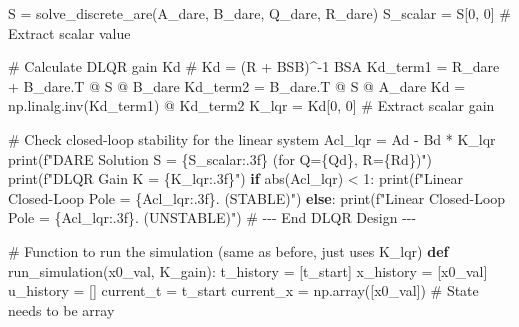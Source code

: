 \documentclass[
  letterpaper,
  DIV=11,
  numbers=noendperiod,
  oneside]{scrartcl}
\newenvironment{Shaded}{\begin{snugshade}}{\end{snugshade}}
\newcommand{\BuiltInTok}[1]{\textcolor[rgb]{0.00,0.23,0.31}{#1}}
\newcommand{\CommentTok}[1]{\textcolor[rgb]{0.37,0.37,0.37}{#1}}
\newcommand{\ControlFlowTok}[1]{\textcolor[rgb]{0.00,0.23,0.31}{\textbf{#1}}}
\newcommand{\DecValTok}[1]{\textcolor[rgb]{0.68,0.00,0.00}{#1}}
\newcommand{\KeywordTok}[1]{\textcolor[rgb]{0.00,0.23,0.31}{\textbf{#1}}}
\newcommand{\NormalTok}[1]{\textcolor[rgb]{0.00,0.23,0.31}{#1}}
\newcommand{\OperatorTok}[1]{\textcolor[rgb]{0.37,0.37,0.37}{#1}}
\newcommand{\SpecialCharTok}[1]{\textcolor[rgb]{0.37,0.37,0.37}{#1}}
\newcommand{\SpecialStringTok}[1]{\textcolor[rgb]{0.13,0.47,0.30}{#1}}
\begin{document}
\begin{Shaded}
\begin{Highlighting}[numbers=left,,]
\NormalTok{S }\OperatorTok{=}\NormalTok{ solve\_discrete\_are(A\_dare, B\_dare, Q\_dare, R\_dare)}
\NormalTok{S\_scalar }\OperatorTok{=}\NormalTok{ S[}\DecValTok{0}\NormalTok{, }\DecValTok{0}\NormalTok{] }\CommentTok{\# Extract scalar value}

\CommentTok{\# Calculate DLQR gain Kd}
\CommentTok{\# Kd = (R + B\textquotesingle{}SB)\^{}{-}1 B\textquotesingle{}SA}
\NormalTok{Kd\_term1 }\OperatorTok{=}\NormalTok{ R\_dare }\OperatorTok{+}\NormalTok{ B\_dare.T }\OperatorTok{@}\NormalTok{ S }\OperatorTok{@}\NormalTok{ B\_dare}
\NormalTok{Kd\_term2 }\OperatorTok{=}\NormalTok{ B\_dare.T }\OperatorTok{@}\NormalTok{ S }\OperatorTok{@}\NormalTok{ A\_dare}
\NormalTok{Kd }\OperatorTok{=}\NormalTok{ np.linalg.inv(Kd\_term1) }\OperatorTok{@}\NormalTok{ Kd\_term2}
\NormalTok{K\_lqr }\OperatorTok{=}\NormalTok{ Kd[}\DecValTok{0}\NormalTok{, }\DecValTok{0}\NormalTok{] }\CommentTok{\# Extract scalar gain}

\CommentTok{\# Check closed{-}loop stability for the linear system}
\NormalTok{Acl\_lqr }\OperatorTok{=}\NormalTok{ Ad }\OperatorTok{{-}}\NormalTok{ Bd }\OperatorTok{*}\NormalTok{ K\_lqr}
\BuiltInTok{print}\NormalTok{(}\SpecialStringTok{f"DARE Solution S = }\SpecialCharTok{\{}\NormalTok{S\_scalar}\SpecialCharTok{:.3f\}}\SpecialStringTok{ (for Q=}\SpecialCharTok{\{}\NormalTok{Qd}\SpecialCharTok{\}}\SpecialStringTok{, R=}\SpecialCharTok{\{}\NormalTok{Rd}\SpecialCharTok{\}}\SpecialStringTok{)"}\NormalTok{)}
\BuiltInTok{print}\NormalTok{(}\SpecialStringTok{f"DLQR Gain K = }\SpecialCharTok{\{}\NormalTok{K\_lqr}\SpecialCharTok{:.3f\}}\SpecialStringTok{"}\NormalTok{)}
\ControlFlowTok{if} \BuiltInTok{abs}\NormalTok{(Acl\_lqr) }\OperatorTok{\textless{}} \DecValTok{1}\NormalTok{:}
    \BuiltInTok{print}\NormalTok{(}\SpecialStringTok{f"Linear Closed{-}Loop Pole = }\SpecialCharTok{\{}\NormalTok{Acl\_lqr}\SpecialCharTok{:.3f\}}\SpecialStringTok{. (STABLE)"}\NormalTok{)}
\ControlFlowTok{else}\NormalTok{:}
    \BuiltInTok{print}\NormalTok{(}\SpecialStringTok{f"Linear Closed{-}Loop Pole = }\SpecialCharTok{\{}\NormalTok{Acl\_lqr}\SpecialCharTok{:.3f\}}\SpecialStringTok{. (UNSTABLE)"}\NormalTok{)}
\CommentTok{\# {-}{-}{-} End DLQR Design {-}{-}{-}}

\CommentTok{\# Function to run the simulation (same as before, just uses K\_lqr)}
\KeywordTok{def}\NormalTok{ run\_simulation(x0\_val, K\_gain):}
\NormalTok{    t\_history }\OperatorTok{=}\NormalTok{ [t\_start]}
\NormalTok{    x\_history }\OperatorTok{=}\NormalTok{ [x0\_val]}
\NormalTok{    u\_history }\OperatorTok{=}\NormalTok{ []}
\NormalTok{    current\_t }\OperatorTok{=}\NormalTok{ t\_start}
\NormalTok{    current\_x }\OperatorTok{=}\NormalTok{ np.array([x0\_val]) }\CommentTok{\# State needs to be array}


\end{Highlighting}
\end{Shaded}
\end{document}
